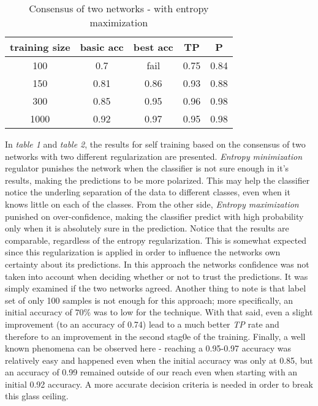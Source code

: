\documentclass[conference, letterpaper]{IEEEtran}
\begin{document}
\begin{table}
\begin{center}
\begin{tabular}{|c|c|c|c|c|}\hline
training size & basic acc  & best acc & TP & P \\ \hline\hline
100  & 0.7  &  fail  & 0.75 & 0.84\\
150  & 0.81 &  0.86  & 0.93 & 0.88\\
300  & 0.85  & 0.95 & 0.96 & 0.98\\
1000 & 0.92  & 0.97 & 0.95 & 0.98 \\ \hline
\end{tabular}
\end{center}
\caption{Consensus of two networks - with entropy maximization}
\label{table:2}
\end{table}

In \textit{table 1} and \textit{table 2}, the results for self training based on the consensus of two networks with two different regularization are presented. \textit{Entropy minimization} regulator punishes the network when the classifier is not sure enough in it's results, making the predictions to be more polarized. This may help the classifier notice the underling separation of the data to different classes, even when it knows little on each of the classes. From the other side, \textit{Entropy maximization} punished on over-confidence, making the classifier predict with high probability only when it is absolutely sure in the prediction. 
Notice that the results are comparable, regardless of the entropy regularization. This is somewhat expected since this regularization is applied in order to influence the networks own certainty about its predictions. In this approach the networks confidence was not taken into account when deciding whether or not to trust the predictions. It was simply examined if the two networks agreed. Another thing to note is that label set of only 100 samples is not enough for this approach; more specifically, an initial accuracy of  $70\%$  was to low for the technique. With that said, even a slight improvement (to an accuracy of  0.74) lead to a much better \textit{TP} rate and therefore to an improvement in the second stag0e of the training. Finally, a well known phenomena can be observed here - reaching a 0.95-0.97 accuracy was relatively easy and happened even when the initial accuracy was only at 0.85, but an accuracy of 0.99 remained outside of our reach even when starting with an initial 0.92 accuracy. A more accurate decision criteria is needed in order to break this glass ceiling.
\end{document}
